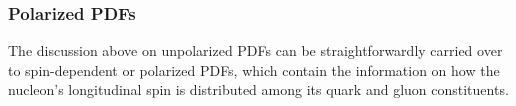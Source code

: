 
\subsubsection{Polarized PDFs}

The discussion above on unpolarized PDFs can be straightforwardly carried over to spin-dependent
or polarized PDFs, which contain the information on how the nucleon's longitudinal spin
is distributed among its quark and gluon constituents.

